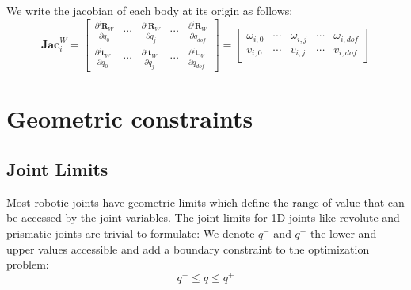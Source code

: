 We write the jacobian of each body at its origin as follows:
\begin{equation}
  \mathbf{Jac}^W_i = 
  \begin{bmatrix}
    \frac{\partial {}^i\mathbf{R}_W}{\partial q_0} & \cdots &
    \frac{\partial {}^i\mathbf{R}_W}{\partial q_j} & \cdots &
    \frac{\partial {}^i\mathbf{R}_W}{\partial q_{dof}} \\
    \frac{\partial {}^i\mathbf{t}_W}{\partial q_0} & \cdots &
    \frac{\partial {}^i\mathbf{t}_W}{\partial q_j} & \cdots &
    \frac{\partial {}^i\mathbf{t}_W}{\partial q_{dof}}
  \end{bmatrix}
= 
  \begin{bmatrix}
    \omega_{i,0} & \cdots &
    \omega_{i,j} & \cdots &
    \omega_{i,dof} \\
    v_{i,0} & \cdots &
    v_{i,j} & \cdots &
    v_{i,dof}
  \end{bmatrix}
\end{equation}



\section{Geometric constraints}
\label{sec:geometric_constraints}


\subsection{Joint Limits}
\label{sub:joint_limits}


Most robotic joints have geometric limits which define the range of value that can be accessed by the joint variables.
The joint limits for 1D joints like revolute and prismatic joints are trivial to formulate: We denote $q^-$ and $q^+$ the lower and upper values accessible and add a boundary constraint to the optimization problem:
\begin{equation}
\label{eq:joint_limits}
  \boxed{q^- \leq q \leq q^+}
\end{equation}


